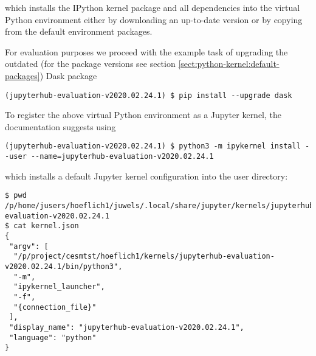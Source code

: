 %
which installs the IPython kernel package and all dependencies into the virtual Python environment either by downloading an up-to-date version or by copying from the default environment packages.

For evaluation purposes we proceed with the example task of upgrading the outdated (for the package versions see section \ref{sect:python-kernel:default-packages}) Dask package
%
\begin{verbatim}
(jupyterhub-evaluation-v2020.02.24.1) $ pip install --upgrade dask
\end{verbatim}
%

To register the above virtual Python environment as a Jupyter kernel, the documentation suggests using
%
\begin{verbatim}
(jupyterhub-evaluation-v2020.02.24.1) $ python3 -m ipykernel install --user --name=jupyterhub-evaluation-v2020.02.24.1
\end{verbatim}
%
which installs a default Jupyter kernel configuration into the user directory:
%
\begin{verbatim}
$ pwd
/p/home/jusers/hoeflich1/juwels/.local/share/jupyter/kernels/jupyterhub-evaluation-v2020.02.24.1
$ cat kernel.json
{
 "argv": [
  "/p/project/cesmtst/hoeflich1/kernels/jupyterhub-evaluation-v2020.02.24.1/bin/python3",
  "-m",
  "ipykernel_launcher",
  "-f",
  "{connection_file}"
 ],
 "display_name": "jupyterhub-evaluation-v2020.02.24.1",
 "language": "python"
}
\end{verbatim}

